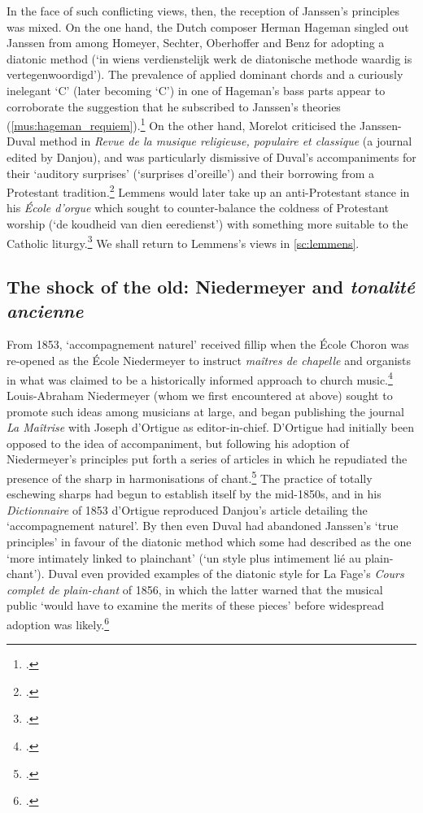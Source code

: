 %
In the face of such conflicting views, then, the reception of Janssen's principles was mixed.
On the one hand, the Dutch composer Herman Hageman singled out Janssen from among Homeyer, Sechter, Oberhoffer and Benz for adopting a diatonic method (`in wiens verdienstelijk werk de diatonische methode waardig is vertegenwoordigd').
The prevalence of applied dominant chords and a curiously inelegant `C'\kern 1pt\sharp{} (later becoming `C'\kern 1pt\natural{}) in one of Hageman's bass parts appear to corroborate the suggestion that he subscribed to Janssen's theories (\cref{mus:hageman_requiem}).\footcite[iii, 65]{HagemanVerzamelingvanGregoriaansche1859}
On the other hand, Morelot criticised the Janssen-Duval method in \textit{Revue de la musique religieuse, populaire et classique} (a journal edited by Danjou), and was particularly dismissive of Duval's accompaniments for their `auditory surprises' (`surprises d'oreille') and their borrowing from a Protestant tradition.\footcite[451--2]{MorelotRevuecritique1845}
Lemmens would later take up an anti-Protestant stance in his \emph{École d'orgue} which sought to counter-balance the coldness of Protestant worship (`de koudheid van dien eeredienst') with something more suitable to the Catholic liturgy.\footcites[p.~v]{LemmensJacques-NicolasEcoleorguebasee1869}[17]{ErensJaakLemmensstichter}
We shall return to Lemmens's views in \cref{sc:lemmens}.


\subsection{The shock of the old: Niedermeyer and \emph{tonalité ancienne}}
\label{hl:nied}%
From 1853, `accompagnement naturel' received fillip when the École Choron was re-opened as the École Niedermeyer to instruct \textit{maîtres de chapelle} and organists in what was claimed to be a historically informed approach to church music.\footcite[71]{EllisInterpretingMusicalEarly2005}
Louis-Abraham Niedermeyer (whom we first encountered at  above) sought to promote such ideas among musicians at large, and began publishing the journal \emph{La Maîtrise} with Joseph d'Ortigue  as editor-in-chief.
%
D'Ortigue had initially been opposed to the idea of accompaniment, but following his adoption of Niedermeyer's principles put forth a series of articles in which he repudiated the presence of the sharp in harmonisations of chant.\footcites[col.~497]{DOrtigueDiese1854}[54]{ChristensenStoriesTonalityAge2019}
The practice of totally eschewing sharps had begun to establish itself by the mid-1850s, and in his \emph{Dictionnaire} of 1853 d'Ortigue reproduced Danjou's article detailing the `accompagnement naturel'. By then even Duval had abandoned Janssen's `true principles' in favour of the diatonic method which some had described as the one `more intimately linked to plainchant' (`un style plus intimement lié au plain-chant').
Duval even provided examples of the diatonic style for La Fage's \emph{Cours complet de plain-chant} of 1856, in which the latter warned that the musical public `would have to examine the merits of these pieces' before widespread adoption was likely.\footcite[871--2]{LaFageCourscompletplainchant1856}

